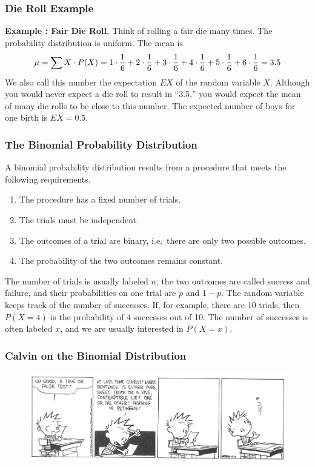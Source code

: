 \documentclass[xcolor=dvipsnames]{beamer}
\newcounter{expls}
\newcommand{\beispiel}[1]{\refstepcounter{expls}\textbf{Example \arabic{expls}: #1.}}
\begin{document}
\begin{frame}
  \frametitle{Die Roll Example}
\beispiel{Fair Die Roll}\label{ex:reinooth} Think of rolling a fair die
many times. The probability distribution is uniform. The mean is
\begin{equation}
  \label{eq:isiamaih}
   \mu=\sum{}X\cdot{}P(X)=1\cdot{}\frac{1}{6}+2\cdot{}\frac{1}{6}+3\cdot{}\frac{1}{6}+4\cdot{}\frac{1}{6}+5\cdot{}\frac{1}{6}+6\cdot{}\frac{1}{6}=3.5\notag
\end{equation}
We also call this number the \alert{expectation} $EX$ of the random
variable $X$. Although you would never expect a die roll to result in
``3.5,'' you would expect the mean of many die rolls to be close to
this number. The expected number of boys for one birth is $EX=0.5$.
\end{frame}

\begin{frame}
  \frametitle{The Binomial Probability Distribution}
A \alert{binomial probability distribution} results from a procedure
that meets the following requirements.
\begin{enumerate}
\item The procedure has a fixed number of trials.
\item The trials must be independent.
\item The outcomes of a trial are binary, i.e.\ there are only two
  possible outcomes.
\item The probability of the two outcomes remains constant.
\end{enumerate}
The number of trials is usually labeled $n$, the two outcomes are
called \alert{success} and \alert{failure}, and their probabilities on
one trial are $p$ and $1-p$. The random variable keeps track of the
number of successes. If, for example, there are 10 trials, then
$P(X=4)$ is the probability of 4 successes out of 10. The number of
successes is often labeled $x$, and we are usually interested in
$P(X=x)$.
\end{frame}

\begin{frame}
  \frametitle{Calvin on the Binomial Distribution}
\begin{figure}[h]
\includegraphics[scale=.43]{./diagrams/calvin_hobbes_binomial_edited.jpg}
\end{figure}
\end{frame}
\end{document}
